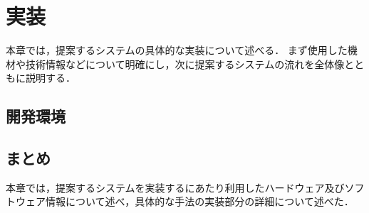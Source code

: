 \chapter{実装}

本章では，提案するシステムの具体的な実装について述べる．
まず使用した機材や技術情報などについて明確にし，次に提案するシステムの流れを全体像とともに説明する．

\section{開発環境}
\section{まとめ}
本章では，提案するシステムを実装するにあたり利用したハードウェア及びソフトウェア情報について述べ，具体的な手法の実装部分の詳細について述べた．
